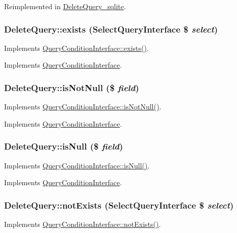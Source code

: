 Reimplemented in \hyperlink{classDeleteQuery__sqlite_adfbc9a2783273c02c450bb0d7ff853a8}{DeleteQuery\_\-sqlite}.\hypertarget{classDeleteQuery_a22517a3fa29261685dd9f4a26b8cbb37}{
\subsubsection[{exists}]{\setlength{\rightskip}{0pt plus 5cm}DeleteQuery::exists ({\bf SelectQueryInterface} \$ {\em select})}}
\label{classDeleteQuery_a22517a3fa29261685dd9f4a26b8cbb37}
Implements \hyperlink{interfaceQueryConditionInterface_a27a52b6e84393275ad2c54eaf1bd764a}{QueryConditionInterface::exists()}. 

Implements \hyperlink{interfaceQueryConditionInterface_a27a52b6e84393275ad2c54eaf1bd764a}{QueryConditionInterface}.\hypertarget{classDeleteQuery_a673730f62b32a5111f4930d3a2e6cf89}{
\subsubsection[{isNotNull}]{\setlength{\rightskip}{0pt plus 5cm}DeleteQuery::isNotNull (\$ {\em field})}}
\label{classDeleteQuery_a673730f62b32a5111f4930d3a2e6cf89}
Implements \hyperlink{interfaceQueryConditionInterface_a8bbb6acc9c72911b165cf6eb1dc31453}{QueryConditionInterface::isNotNull()}. 

Implements \hyperlink{interfaceQueryConditionInterface_a8bbb6acc9c72911b165cf6eb1dc31453}{QueryConditionInterface}.\hypertarget{classDeleteQuery_a2b252e7602b7b0e677ef79ae33af7dcd}{
\subsubsection[{isNull}]{\setlength{\rightskip}{0pt plus 5cm}DeleteQuery::isNull (\$ {\em field})}}
\label{classDeleteQuery_a2b252e7602b7b0e677ef79ae33af7dcd}
Implements \hyperlink{interfaceQueryConditionInterface_a2978b536a3fe62b21e940366c9cb5923}{QueryConditionInterface::isNull()}. 

Implements \hyperlink{interfaceQueryConditionInterface_a2978b536a3fe62b21e940366c9cb5923}{QueryConditionInterface}.\hypertarget{classDeleteQuery_a026548cee31db2472b2b3b83c5c104c3}{
\subsubsection[{notExists}]{\setlength{\rightskip}{0pt plus 5cm}DeleteQuery::notExists ({\bf SelectQueryInterface} \$ {\em select})}}
\label{classDeleteQuery_a026548cee31db2472b2b3b83c5c104c3}
Implements \hyperlink{interfaceQueryConditionInterface_a8aae11796846850edbf8caa3a9d4afcd}{QueryConditionInterface::notExists()}. 

